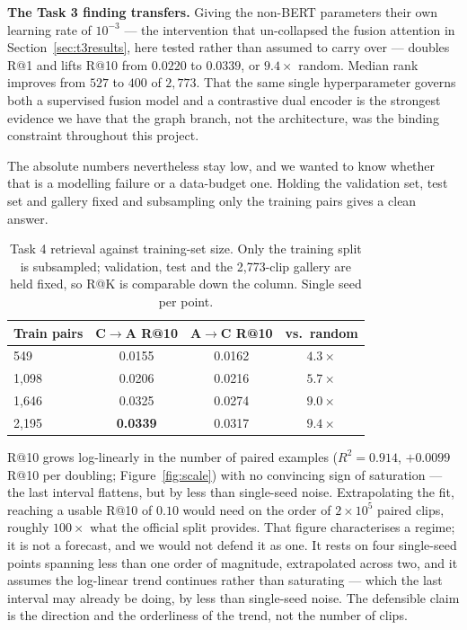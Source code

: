\documentclass[conference]{IEEEtran}
\begin{document}
\noindent \textbf{The Task 3 finding transfers.} Giving the non-BERT parameters their own
learning rate of $10^{-3}$ --- the intervention that un-collapsed the fusion
attention in Section~\ref{sec:t3results}, here tested rather than assumed to
carry over --- doubles R@1 and lifts R@10 from $0.0220$ to $0.0339$, or
$9.4\times$ random. Median rank improves from $527$ to $400$ of $2{,}773$. That
the same single hyperparameter governs both a supervised fusion model and a
contrastive dual encoder is the strongest evidence we have that the graph
branch, not the architecture, was the binding constraint throughout this
project.

The absolute numbers nevertheless stay low, and we wanted to know whether that
is a modelling failure or a data-budget one. Holding the validation set, test
set and gallery fixed and subsampling only the training pairs gives a clean
answer.

\begin{table}[H]
\centering\small
\caption{Task 4 retrieval against training-set size. Only the training split is
subsampled; validation, test and the 2{,}773-clip gallery are held fixed, so
R@K is comparable down the column. Single seed per point.}
\label{tab:scale}
\begin{tabular}{lccc}
\toprule
Train pairs & C$\to$A R@10 & A$\to$C R@10 & vs.\ random \\
\midrule
549   & 0.0155 & 0.0162 & $4.3\times$ \\
1,098 & 0.0206 & 0.0216 & $5.7\times$ \\
1,646 & 0.0325 & 0.0274 & $9.0\times$ \\
2,195 & \textbf{0.0339} & 0.0317 & $\mathbf{9.4\times}$ \\
\bottomrule
\end{tabular}
\end{table}

\noindent R@10 grows log-linearly in the number of paired examples
($R^2 = 0.914$, $+0.0099$ R@10 per doubling; Figure~\ref{fig:scale}) with no
convincing sign of saturation --- the last interval flattens, but by less than
single-seed noise. Extrapolating the fit, reaching a usable R@10 of $0.10$ would
need on the order of $2\times10^5$ paired clips, roughly $100\times$ what the
official split provides. That figure characterises a regime; it is not a
forecast, and we would not defend it as one. It rests on four single-seed
points spanning less than one order of magnitude, extrapolated across two,
and it assumes the log-linear trend continues rather than saturating --- which the last interval may already be doing, by less than single-seed
noise. The defensible claim is the direction and the orderliness of the
trend, not the number of clips.
\end{document}
